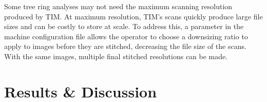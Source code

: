 \documentclass[a4paper,12pt]{article}
\begin{document}
Some tree ring analyses may not need the maximum scanning resolution produced by TIM. At maximum resolution, TIM's scans quickly produce large file sizes and can be costly to store at scale. 
To address this, a parameter in the machine configuration file allows the operator to choose a downsizing ratio to apply to images before they are stitched, decreasing the file size of the scans.
With the same images, multiple final stitched resolutions can be made. 

\section{Results \& Discussion} 
\end{document}
